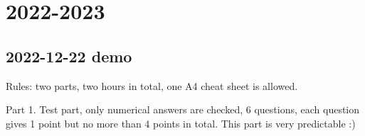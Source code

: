 \documentclass[11pt, a4paper]{article}
\theoremstyle{definition}
\begin{document}
%
%
%
%



\section{2022-2023}

\subsection{2022-12-22 demo}


Rules: two parts, two hours in total, one A4 cheat sheet is allowed. 

\vspace{1cm}

Part 1. Test part, only numerical answers are checked, 6 questions, each question gives 1 point but no more than 4 points in total. 
This part is very predictable :) 
\end{document}
